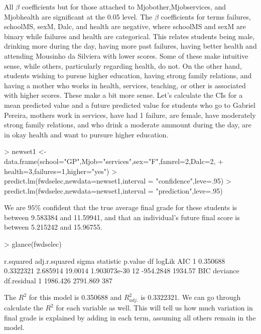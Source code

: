 \documentclass{article}
\begin{document}
All $\beta$ coefficients but for those attached to Mjobother,Mjobservices, and Mjobhealth are significant at the 0.05 level. The $\beta$ coefficients for terms failures, schoolMS, sexM, Dalc, and health are negative, where schoolMS and sexM are binary while failures and health are categorical. This relates students being male, drinking more during the day, having more past failures, having better health and attending Mousinho da Silviera with lower scores. Some of these make intuitive sense, while others, particularly regarding health, do not. On the other hand, students wishing to pursue higher education, having strong family relations, and having a mother who works in health, services, teaching, or other is associated with higher scores. These make a bit more sense. 
Let's calculate the CIs for a mean predicted value and a future predicted value for students who go to Gabriel Pereira, mothers work in services, have had 1 failure, are female, have moderately strong family relations, and who drink a moderate ammount during the day, are in okay health and want to pursure higher education.
\begin{Schunk}
\begin{Sinput}
> newset1 <- data.frame(school="GP",Mjob="services",sex="F",famrel=2,Dalc=2,
+                       health=3,failures=1,higher="yes")
> predict.lm(fwdselec,newdata=newset1,interval = "confidence",leve=.95)
> predict.lm(fwdselec,newdata=newset1,interval = "prediction",leve=.95)
\end{Sinput}
\end{Schunk}

We are $95\%$ confident that the true average final grade for these students  is between 9.583384 and 11.59941, and that an individual's future final score is between 5.215242 and 15.96755. 

\begin{Schunk}
\begin{Sinput}
> glance(fwdselec)
\end{Sinput}
\begin{Soutput}
  r.squared adj.r.squared    sigma statistic      p.value df    logLik     AIC
1  0.350688     0.3322321 2.685914   19.0014 1.903073e-30 12 -954.2848 1934.57
       BIC deviance df.residual
1 1986.426 2791.869         387
\end{Soutput}
\end{Schunk}
The $R^2$ for this model is 0.350688 and $R_{adj.}^2$ is 0.3322321. We can go through calculate the $R^2$ for each variable as well. This will tell us how much variation in final grade is explained by adding in each term, assuming all others remain in the model.
\end{document}
